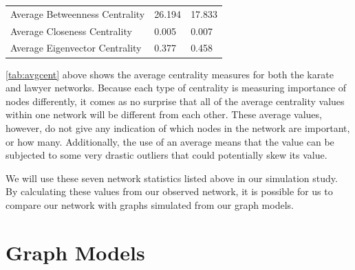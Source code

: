 \documentclass[12pt,twoside]{amherstthesis}
\begin{document}
\begin{longtable}[]{@{}lll@{}}
\begin{minipage}[t]{0.36\columnwidth}
  Average Betweenness Centrality\strut
  \end{minipage} & \begin{minipage}[t]{0.28\columnwidth}\raggedright\strut
  26.194\strut
  \end{minipage} & \begin{minipage}[t]{0.28\columnwidth}\raggedright\strut
  17.833\strut
  \end{minipage}\tabularnewline
  \begin{minipage}[t]{0.36\columnwidth}\raggedright\strut
  Average Closeness Centrality\strut
  \end{minipage} & \begin{minipage}[t]{0.28\columnwidth}\raggedright\strut
  0.005\strut
  \end{minipage} & \begin{minipage}[t]{0.28\columnwidth}\raggedright\strut
  0.007\strut
  \end{minipage}\tabularnewline
  \begin{minipage}[t]{0.36\columnwidth}\raggedright\strut
  Average Eigenvector Centrality\strut
  \end{minipage} & \begin{minipage}[t]{0.28\columnwidth}\raggedright\strut
  0.377\strut
  \end{minipage} & \begin{minipage}[t]{0.28\columnwidth}\raggedright\strut
  0.458\strut
  \end{minipage}\tabularnewline
  \bottomrule
  \end{longtable}
  
  \autoref{tab:avgcent} above shows the average centrality measures for
  both the karate and lawyer networks. Because each type of centrality is
  measuring importance of nodes differently, it comes as no surprise that
  all of the average centrality values within one network will be
  different from each other. These average values, however, do not give
  any indication of which nodes in the network are important, or how many.
  Additionally, the use of an average means that the value can be
  subjected to some very drastic outliers that could potentially skew its
  value.
  
  We will use these seven network statistics listed above in our
  simulation study. By calculating these values from our observed network,
  it is possible for us to compare our network with graphs simulated from
  our graph models.
  
  \chapter{Graph Models}\label{graph-models}
  
\end{document}
